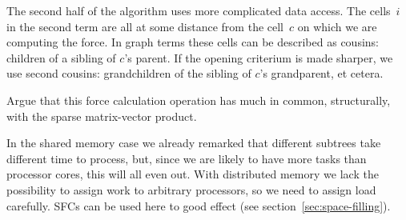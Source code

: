 The second half of the algorithm uses more complicated data
access. The cells~$i$ in the second term are all at some distance from
the cell~$c$ on which we are computing the force. In graph terms these
cells can be described as cousins: children of a sibling of $c$'s
parent. If the opening criterium is made sharper, we use second
cousins: grandchildren of the sibling of $c$'s grandparent, et cetera.


\begin{exercise}
  Argue that this force calculation operation has much in common,
  structurally, with the sparse matrix-vector product.
\end{exercise}

In the shared memory case we already remarked that different subtrees
take different time to process, but, since we are likely to have more
tasks than processor cores, this will all even out. With distributed
memory we lack the possibility to assign work to arbitrary processors,
so we need to assign load carefully. \acfp{SFC} can be used here 
to good effect (see section~\ref{sec:space-filling}).


\endinput 

http://www.cs.berkeley.edu/~demmel/cs267/lecture27/lecture27.html

Interaction
between discrete elements:
\begin{itemize}
\item external
\item nearby 
\item far
\end{itemize}

External forces are simple and conveniently parallel.

Nearby forces are easy to handle if spatial domain decomposition is
used: at best ghost regions needed.

Load imbalance because of particle migration.

Far-field forces are difficult because every particle interacts with
every other: naive algorithms are $O(n^2)$.

Particle-mesh methods: move particles to nearby mesh points, use the
fact that the far-field equation satisfies a PDE that is easy to
solve, use FFT or multigrid (complexity $O(n\log n)$, calculate forces
by interpolation.

Approximation by letting faraway particles act as group:
\begin{enumerate}
\item Barnes-Hut
\item \acfp{FMM}
\end{enumerate}
Also $n\log n$ complexity.
